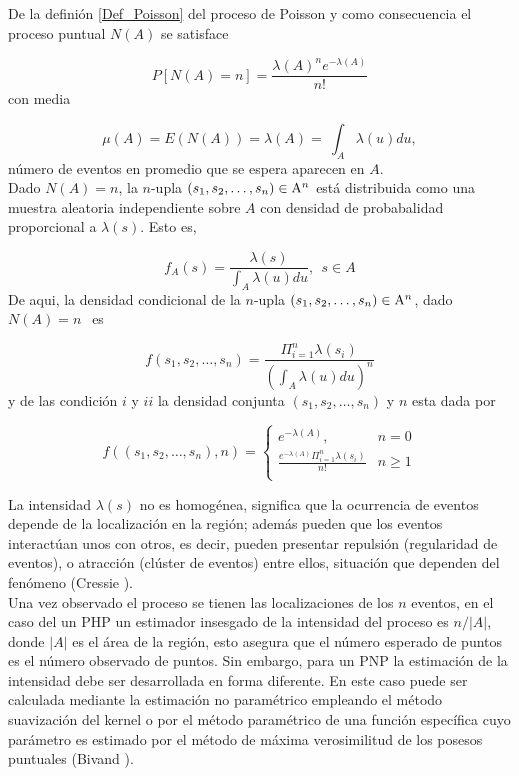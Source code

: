 \documentclass[12pt]{report}
\begin{document}
		
		De la definión \ref{Def_Poisson} del proceso de Poisson  y como consecuencia el proceso  puntual $N(A)$ se satisface 
		
		
		\[P [ N(A)  = n] =  \frac{ \lambda(A)^{n} e^{-\lambda(A) }}{n!  } \] con media  
		
		\[  \mu(A)= E( N(A) ) = \lambda(A) = \: \int_{A} \lambda(u) du, \]
		número de eventos en promedio que  se espera  aparecen en $A$.\\
		
		
		
		 Dado $N(A) = n$,  la $n$-upla $ (s_{1}, s_{2},\dots, s_{n} ) \in   {\rm  A }^{n} $  está  distribuida como una muestra aleatoria  independiente sobre $A$ con densidad de probabalidad proporcional a $\lambda(s)$. Esto es,   
		
		
		\[f_{A}(s ) = \frac{\lambda(s)  }{ \int_{A} \lambda(u) du  }, \: \:  s \in A\] De aqui, la densidad condicional de la $n$-upla $ (s_{1}, s_{2},\dots, s_{n} ) \in   {\rm  A }^{n}$, dado $ N(A) = n \: \:  $   es 
		
		
		\[f(s_{1}, s_{2},\dots, s_{n} ) = \frac{ \Pi^{n}_{i=1}\lambda(s_{i})  }{( \int_{A} \lambda(u) du )^{n} }  \] y de las condición $i$ y $ii$ la densidad conjunta   $ (s_{1}, s_{2},\dots, s_{n} )$  y $n$ esta dada por 
		
		
		
		
		\begin{displaymath}
		f((s_{1}, s_{2},\dots, s_{n} ),n ) = \left\{ \begin{array}{rcl}
		e^{-\lambda(A)},         & n  =  0  \\
		\frac{ e^{-\lambda(A)}  \Pi^{n}_{i=1} \lambda(s_{i}) }{n!} & n\geq 1 \\
		\end{array}
		\right.            
		\end{displaymath}
		
		
		
		La intensidad $\lambda(s) $  no es homogénea, significa que la ocurrencia de eventos depende de la localización  en la región; además pueden que los eventos  interactúan unos con otros, es decir, pueden presentar  repulsión (regularidad de eventos), o atracción (clúster de eventos) entre ellos,  situación que  dependen del fenómeno (Cressie \cite{Cress}).  \\
			
			Una vez observado el proceso se tienen las localizaciones de los $n$ eventos, en el caso del un PHP un estimador insesgado de la intensidad del proceso es $n/|A|$, donde $|A|$ es el área de la región, esto asegura que el número esperado de puntos es el número observado de puntos. Sin embargo, para un PNP la estimación de la intensidad debe ser desarrollada en forma diferente. En este caso puede ser calculada mediante la estimación no paramétrico empleando el método suavización del kernel o por el método paramétrico de una función específica cuyo parámetro es estimado por el método de máxima verosimilitud de los posesos puntuales (Bivand  \cite{Roger}). \\
		
\end{document}
